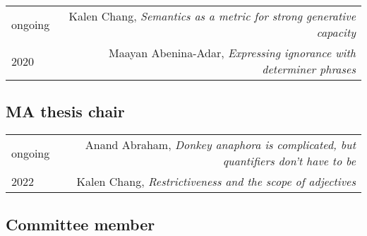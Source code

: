 \documentclass[12pt]{article}
\begin{document}
\begin{longtable}{LR}
  ongoing & Kalen Chang, \textit{Semantics as a metric for strong generative
            capacity}
  \\
  2020    & Maayan Abenina-Adar, \textit{Expressing ignorance with determiner
            phrases}
\end{longtable}

\subsection*{MA thesis chair}

\begin{longtable}{LR}
  ongoing & Anand Abraham, \textit{Donkey anaphora is complicated, but
            quantifiers don't have to be}\\
  2022    & Kalen Chang, \textit{Restrictiveness and the scope of adjectives}
\end{longtable}

\subsection*{Committee member}
\end{document}
